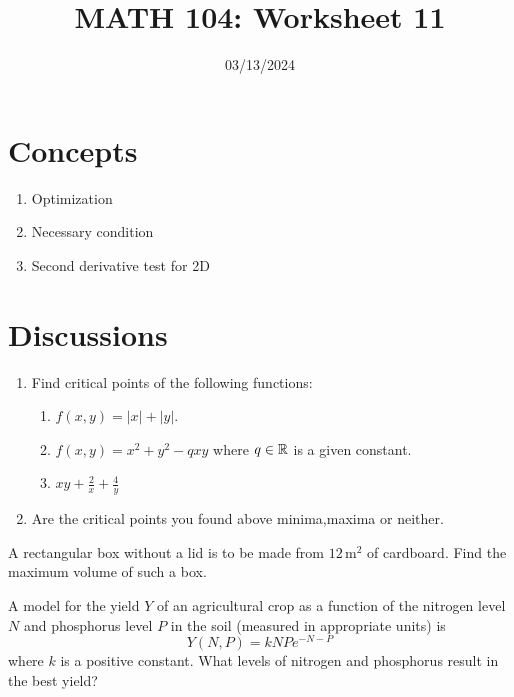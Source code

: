 \documentclass[12pt]{amsart}
\title{ MATH 104: Worksheet 11}
\author{}
\date{03/13/2024}
\begin{document}
\maketitle


\section{Concepts}

\begin{enumerate}
    \item Optimization
    \item Necessary condition
    \item Second derivative test for 2D
\end{enumerate}

\section{Discussions}

\begin{problem}
    \begin{enumerate}
        \item Find critical points of the following functions:
        \begin{enumerate}
            \item $f(x,y) = | x | + | y |$.
            \item $f(x,y) = x^2 + y^2 - qxy$ where $q\in \mathbb{R}$ is a given constant.
            \item $xy + \frac{2}{x} + \frac{4}{y}$
        \end{enumerate}
        \item Are the critical points you found above minima,maxima or neither.
    \end{enumerate}
\end{problem}


\begin{problem}
    A rectangular box without a lid is to be made from \(12 \, \text{m}^2\) of cardboard. 
    Find the maximum volume of such a box.
\end{problem}

\begin{problem}
    A model for the yield $Y$ of an agricultural crop as a function of the nitrogen level $N$ and phosphorus level $P$ in the soil (measured in appropriate units) is
$$
Y(N, P)=k N P e^{-N-P}
$$
where $k$ is a positive constant. What levels of nitrogen and phosphorus result in the best yield?
\end{problem}
\end{document}
